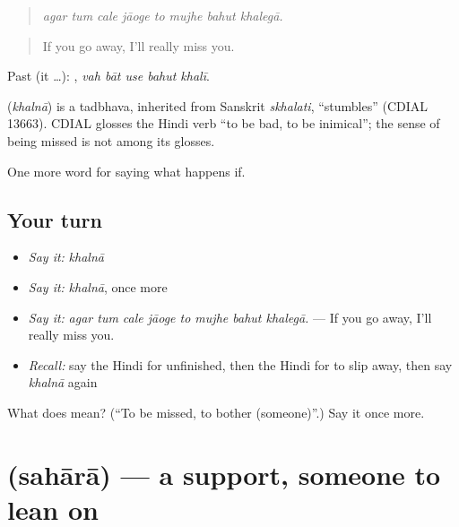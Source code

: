 \begin{quote}
       
\end{quote}

\begin{quote}
\emph{agar tum cale jāoge to mujhe bahut khalegā.}
\end{quote}

\begin{quote}
If you go away, I'll really miss you.
\end{quote}

Past (it …):     , \emph{vah bāt use bahut khalī}.

\begin{cousinweb}
\textbf{} (\emph{khalnā}) is a tadbhava, inherited from Sanskrit \emph{skhalati}, \textquotedblleft{}stumbles\textquotedblright{} (CDIAL 13663). CDIAL glosses the Hindi verb \textquotedblleft{}to be bad, to be inimical\textquotedblright{}; the sense of being missed is not among its glosses.
\end{cousinweb}

\begin{grammarlens}[title={What you've built}]
One more word for saying what happens if.
\end{grammarlens}

\subsection*{Your turn}
\begin{itemize}
\raggedright
  \item \emph{Say it:} \emph{khalnā}
  \item \emph{Say it:} \emph{khalnā}, once more
  \item \emph{Say it:} \emph{agar tum cale jāoge to mujhe bahut khalegā.} — If you go away, I'll really miss you.
  \item \emph{Recall:} say the Hindi for unfinished, then the Hindi for to slip away, then say \emph{khalnā} again
\end{itemize}

\begin{tcolorbox}[breakable,colback=teal!4,colframe=teal!35!black,title={Before you move on}]
What does  mean? (\textquotedblleft{}To be missed, to bother (someone)\textquotedblright{}.) Say it once more.
\end{tcolorbox}
\section[\texorpdfstring{\hi{सहारा} (sahārā)}{सहारा (sahārā)}]{ (sahārā) — a support, someone to lean on}

